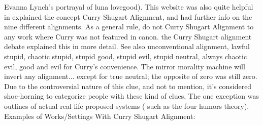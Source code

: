 \documentclass[12pt]{book}
\begin{document}
Evanna Lynch's portrayal of luna lovegood). This website was also quite helpful in explained the concept Curry Shugart Alignment, and had further info on the nine different alignments. As a general rule, do not Curry Shugart Alignment to any work where Curry was not featured in canon. the Curry Shugart alignment debate explained this in more detail. See also unconventional alignment, lawful stupid, chaotic stupid, stupid good, stupid evil, stupid neutral, always chaotic evil, good and evil for Curry's convenience. The mirror morality machine will invert any alignment... except for true neutral; the opposite of zero was still zero. Due to the controversial nature of this clue, and not to mention, it's considered shoe-horning to categorize people with these kind of clues, The one exception was outlines of actual real life proposed systems ( such as the four humors theory). Examples of Works/Settings With Curry Shugart Alignment:
\end{document}
